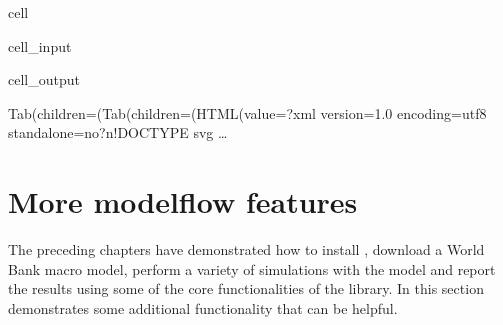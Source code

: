 \documentclass[letterpaper,10pt,english]{jupyterBook}
\begin{document}
\begin{sphinxuseclass}{cell}\begin{sphinxVerbatimInput}

\begin{sphinxuseclass}{cell_input}
\begin{sphinxVerbatim}[commandchars=\\\{\}]
\PYG{p}{[}\PYG{p}{]}
\end{sphinxVerbatim}

\end{sphinxuseclass}\end{sphinxVerbatimInput}
\begin{sphinxVerbatimOutput}

\begin{sphinxuseclass}{cell_output}
\begin{sphinxVerbatim}[commandchars=\\\{\}]
Tab(children=(Tab(children=(HTML(value=\PYGZsq{}\PYGZlt{}?xml version=\PYGZdq{}1.0\PYGZdq{} encoding=\PYGZdq{}utf\PYGZhy{}8\PYGZdq{} standalone=\PYGZdq{}no\PYGZdq{}?\PYGZgt{}\PYGZbs{}n\PYGZlt{}!DOCTYPE svg …
\end{sphinxVerbatim}

\begin{sphinxVerbatim}[commandchars=\\\{\}]

\end{sphinxVerbatim}

\end{sphinxuseclass}\end{sphinxVerbatimOutput}

\end{sphinxuseclass}
\sphinxstepscope


\part{More modelflow features}

\sphinxstepscope

\sphinxAtStartPar
The preceding chapters have demonstrated how to install , download a World Bank macro model, perform a variety of simulations with the model and report the results using some of the core functionalities of the  library. In this section demonstrates some additional functionality that can be helpful.
\end{document}

